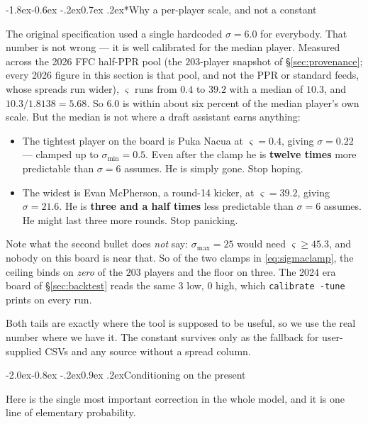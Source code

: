 \documentclass[10pt,a4paper]{article}
\makeatletter
\theoremstyle{plain}
\theoremstyle{definition}
\theoremstyle{remark}
\newcommand{\code}[1]{\texttt{\small #1}}
\renewcommand\subsection{\@startsection{subsection}{2}{\z@}%
  {-2.0ex\@plus -0.8ex \@minus -.2ex}{0.9ex \@plus .2ex}{\normalfont\large\bfseries}}
\renewcommand\subsubsection{\@startsection{subsubsection}{3}{\z@}%
  {-1.8ex\@plus -0.6ex \@minus -.2ex}{0.7ex \@plus .2ex}{\normalfont\normalsize\bfseries}}
\makeatother
\begin{document}
\subsubsection*{Why a per-player scale, and not a constant}

The original specification used a single hardcoded $\sigma = 6.0$ for everybody. That
number is not wrong --- it is well calibrated for the median player. Measured across the
2026 FFC half-PPR pool (the $203$-player snapshot of \S\ref{sec:provenance}; every 2026
figure in this section is that pool, and not the PPR or standard feeds, whose spreads run
wider), $\varsigma$ runs from $0.4$ to $39.2$ with a median of $10.3$, and
$10.3/1.8138 = 5.68$. So $6.0$ is within about six percent of the median player's own
scale. But the median is not where a draft assistant earns anything:

\begin{itemize}
\item The tightest player on the board is Puka Nacua at $\varsigma = 0.4$, giving
$\sigma = 0.22$ --- clamped up to $\sigma_{\min} = 0.5$. Even after the clamp he is
\textbf{twelve times} more predictable than $\sigma = 6$ assumes. He is simply gone. Stop
hoping.
\item The widest is Evan McPherson, a round-14 kicker, at $\varsigma = 39.2$, giving
$\sigma = 21.6$. He is \textbf{three and a half times} less predictable than $\sigma = 6$
assumes. He might last three more rounds. Stop panicking.
\end{itemize}

Note what the second bullet does \emph{not} say: $\sigma_{\max} = 25$ would need
$\varsigma \ge 45.3$, and nobody on this board is near that. So of the two clamps in
\eqref{eq:sigmaclamp}, the ceiling binds on \emph{zero} of the $203$ players and the floor
on three. The 2024 era board of \S\ref{sec:backtest} reads the same $3$ low, $0$ high,
which \code{calibrate -tune} prints on every run.

Both tails are exactly where the tool is supposed to be useful, so we use the real
number where we have it. The constant survives only as the fallback for user-supplied
CSVs and any source without a spread column.

\subsection{Conditioning on the present}
\label{sec:conditioning}

Here is the single most important correction in the whole model, and it is one line of
elementary probability.
\end{document}
